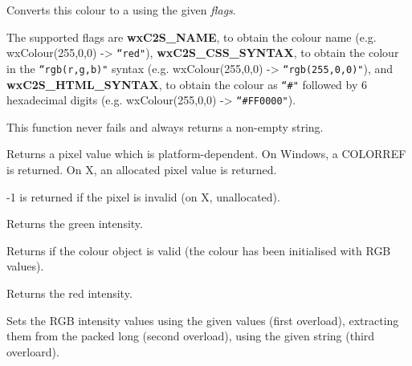 Converts this colour to a 
using the given {\it flags}.

The supported flags are {\bf wxC2S\_NAME}, to obtain the colour
name (e.g. wxColour(255,0,0) -> \texttt{``red"}), {\bf wxC2S\_CSS\_SYNTAX}, to obtain
the colour in the \texttt{``rgb(r,g,b)"} syntax
(e.g. wxColour(255,0,0) -> \texttt{``rgb(255,0,0)"}), and {\bf wxC2S\_HTML\_SYNTAX}, to obtain
the colour as  \texttt{``\#"} followed by 6 hexadecimal digits
(e.g. wxColour(255,0,0) -> \texttt{``\#FF0000"}).

This function never fails and always returns a non-empty string.


\label{wxcolourgetpixel}


Returns a pixel value which is platform-dependent. On Windows, a COLORREF is returned.
On X, an allocated pixel value is returned.

-1 is returned if the pixel is invalid (on X, unallocated).


\label{wxcolourgreen}


Returns the green intensity.


\label{wxcolourisok}


Returns \true if the colour object is valid (the colour has been initialised with RGB values).


\label{wxcolourred}


Returns the red intensity.


\label{wxcolourset}




Sets the RGB intensity values using the given values (first overload), extracting them from the packed long (second overload), using the given string (third overloard).

